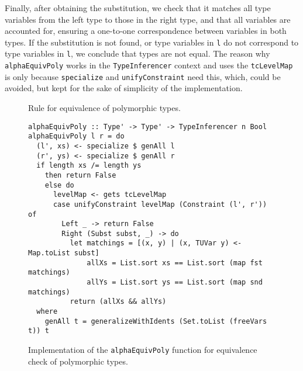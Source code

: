 Finally, after obtaining the substitution, we check that it matches all type variables from the left type to those in the right type, and that all variables are accounted for, ensuring a one-to-one correspondence between variables in both types. If the substitution is not found, or type variables in \texttt{l} do not correspond to type variables in \texttt{l}, we conclude that types are not equal. The reason why \texttt{alphaEquivPoly} works in the \texttt{TypeInferencer} context and uses the \texttt{tcLevelMap} is only because \texttt{specialize} and \texttt{unifyConstraint} need this, which, could be avoided, but kept for the sake of simplicity of the implementation.

\begin{figure}[H]
  \begin{prooftree*}
  \end{prooftree*}
  \caption{Rule for equivalence of polymorphic types.}
  \label{fig:alpha-equiv-poly-rule}
\end{figure}

\begin{figure}[H]
  \begin{verbatim}
alphaEquivPoly :: Type' -> Type' -> TypeInferencer n Bool
alphaEquivPoly l r = do
  (l', xs) <- specialize $ genAll l
  (r', ys) <- specialize $ genAll r
  if length xs /= length ys
    then return False
    else do
      levelMap <- gets tcLevelMap
      case unifyConstraint levelMap (Constraint (l', r')) of
        Left _ -> return False
        Right (Subst subst, _) -> do
          let matchings = [(x, y) | (x, TUVar y) <- Map.toList subst]
              allXs = List.sort xs == List.sort (map fst matchings)
              allYs = List.sort ys == List.sort (map snd matchings)
          return (allXs && allYs)
  where
    genAll t = generalizeWithIdents (Set.toList (freeVars t)) t
  \end{verbatim}
  \caption{Implementation of the \texttt{alphaEquivPoly} function for equivalence check of polymorphic types.}
  \label{fig:alpha-equiv-poly-impl}
\end{figure}
